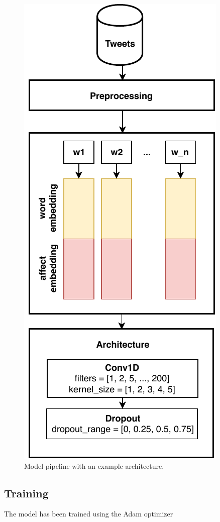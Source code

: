 \documentclass[10pt, a4paper]{article}
\begin{document}
\begin{figure}
\begin{center}
\includegraphics[width=0.7\columnwidth]{images/architecture.pdf}
\caption{Model pipeline with an example architecture.}
\label{fig:figure1}
\end{center}
\end{figure}


\subsection{Training}
The model has been trained using the Adam optimizer 
\end{document}
